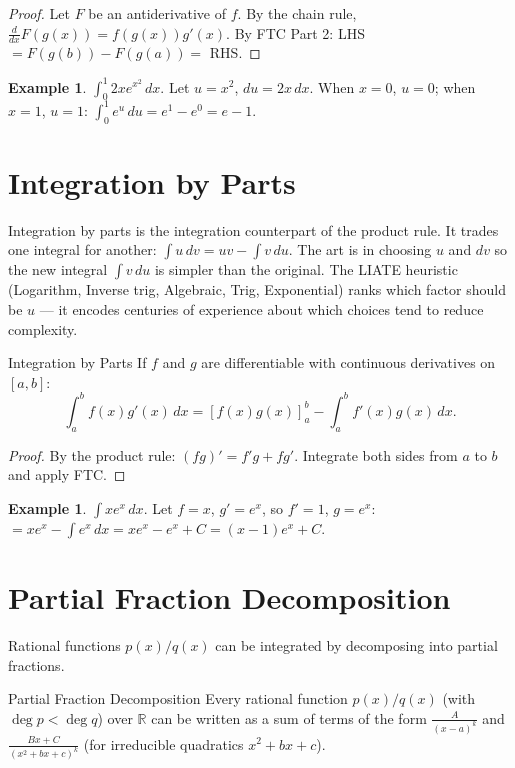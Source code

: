 \documentclass[12pt, openany]{book}
\theoremstyle{plain}
\theoremstyle{definition}
\newtheorem{example}[theorem]{Example}
\theoremstyle{remark}
\newcommand{\R}{\mathbb{R}}
\begin{document}
\begin{proof}
Let $F$ be an antiderivative of $f$. By the chain rule, $\frac{d}{dx}F(g(x)) = f(g(x))g'(x)$. By FTC Part 2: LHS $= F(g(b)) - F(g(a)) =$ RHS.
\end{proof}

\begin{example}
$\int_0^1 2x e^{x^2}\,dx$. Let $u = x^2$, $du = 2x\,dx$. When $x=0$, $u=0$; when $x=1$, $u=1$:
$\int_0^1 e^u\,du = e^1 - e^0 = e - 1$.
\end{example}

\section{Integration by Parts}

Integration by parts is the integration counterpart of the product rule.  It trades one integral for another: $\int u\,dv = uv - \int v\,du$.  The art is in choosing $u$ and $dv$ so the new integral $\int v\,du$ is simpler than the original.  The LIATE heuristic (Logarithm, Inverse trig, Algebraic, Trig, Exponential) ranks which factor should be $u$ --- it encodes centuries of experience about which choices tend to reduce complexity.

\begin{thmbox}{Integration by Parts}
If $f$ and $g$ are differentiable with continuous derivatives on $[a,b]$:
\[ \int_a^b f(x)g'(x)\,dx = [f(x)g(x)]_a^b - \int_a^b f'(x)g(x)\,dx. \]
\end{thmbox}
\color{black}

\begin{proof}
By the product rule: $(fg)' = f'g + fg'$. Integrate both sides from $a$ to $b$ and apply FTC.
\end{proof}

\begin{example}
$\int x e^x\,dx$. Let $f = x$, $g' = e^x$, so $f' = 1$, $g = e^x$:
$= xe^x - \int e^x\,dx = xe^x - e^x + C = (x-1)e^x + C$.
\end{example}

\section{Partial Fraction Decomposition}

Rational functions $p(x)/q(x)$ can be integrated by decomposing into partial fractions.

\begin{thmbox}{Partial Fraction Decomposition}
Every rational function $p(x)/q(x)$ (with $\deg p < \deg q$) over $\R$ can be written as a sum of terms of the form $\frac{A}{(x-a)^k}$ and $\frac{Bx + C}{(x^2 + bx + c)^k}$ (for irreducible quadratics $x^2 + bx + c$).
\end{thmbox}
\color{black}
\end{document}
